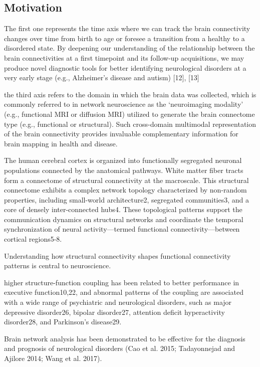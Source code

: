 
\subsection{Motivation}
The first one represents the time axis where we can
track the brain connectivity changes over time from birth to
age or foresee a transition from a healthy to a disordered
state.
By deepening our understanding of the relationship
between the brain connectivities at a first timepoint and its
follow-up acquisitions, we may produce novel diagnostic
tools for better identifying neurological disorders at a very
early stage (e.g., Alzheimer’s disease and autism) [12], [13]

the third axis refers to the domain in
which the brain data was collected, which is commonly
referred to in network neuroscience as the ‘neuroimaging
modality’ (e.g., functional MRI or diffusion MRI) utilized
to generate the brain connectome type (e.g., functional or
structural). Such cross-domain multimodal representation of
the brain connectivity provides invaluable complementary
information for brain mapping in health and disease.
\cite{Bessadok2022}

The human cerebral cortex is organized into functionally segregated 
neuronal populations connected by the anatomical pathways. 
White matter fiber tracts form a connectome of structural 
connectivity at the macroscale. This structural connectome exhibits 
a complex network topology characterized by non-random properties, 
including small-world architecture2, segregated 
communities3, and a core of densely inter-connected hubs4. 
These topological patterns support the communication dynamics on 
structural networks and coordinate the temporal synchronization of 
neural activity—termed functional connectivity—between cortical regions5-8.

Understanding how structural connectivity shapes functional connectivity 
patterns is central to neuroscience. 

higher structure-function coupling has been related to better performance 
in executive function10,22, and abnormal patterns of the
coupling are associated with a wide range of psychiatric and 
neurological disorders, such as major depressive disorder26, 
bipolar disorder27, attention deficit hyperactivity disorder28, 
and Parkinson’s disease29.

\cite{Chen2024}


Brain network analysis has been demonstrated to be effective for the 
diagnosis and prognosis of neurological disorders (Cao et al. 2015; Tadayonnejad
and Ajilore 2014; Wang et al. 2017). \cite{Zhang2022}

